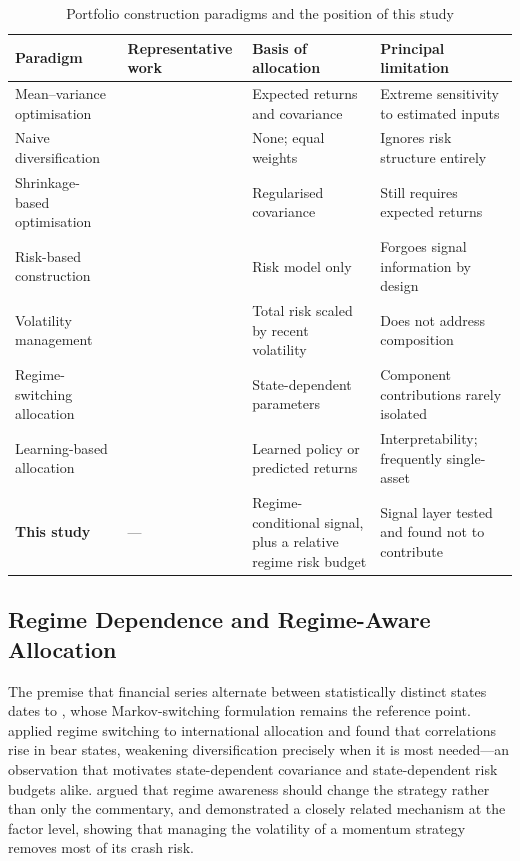 \begin{table}[!ht]
\centering
\caption{Portfolio construction paradigms and the position of this study}
\label{tab:paradigms}
\small
\begin{tabular}{p{2.4cm}p{2.4cm}p{2.6cm}p{2.6cm}}
\hline
\textbf{Paradigm} & \textbf{Representative work} & \textbf{Basis of allocation} & \textbf{Principal limitation} \\
\hline
Mean--variance optimisation & \citet{markowitz52} & Expected returns and covariance & Extreme sensitivity to estimated inputs \\
\hline
Naive diversification & \citet{demiguel09} & None; equal weights & Ignores risk structure entirely \\
\hline
Shrinkage-based optimisation & \citet{ledoit04, lu25} & Regularised covariance & Still requires expected returns \\
\hline
Risk-based construction & \citet{prado16, asimit25} & Risk model only & Forgoes signal information by design \\
\hline
Volatility management & \citet{moreira17, hood25} & Total risk scaled by recent volatility & Does not address composition \\
\hline
Regime-switching allocation & \citet{angbekaert02, kritzman12, luo26} & State-dependent parameters & Component contributions rarely isolated \\
\hline
Learning-based allocation & \citet{jiang25, ashrafzadeh25, agal25} & Learned policy or predicted returns & Interpretability; frequently single-asset \\
\hline
\textbf{This study} & --- & Regime-conditional signal, plus a relative regime risk budget & Signal layer tested and found not to contribute \\
\hline
\end{tabular}
\end{table}

\subsection{Regime Dependence and Regime-Aware Allocation}

The premise that financial series alternate between statistically distinct states dates
to \citet{hamilton89}, whose Markov-switching formulation remains the reference point.
\citet{angbekaert02} applied regime switching to international allocation and found that
correlations rise in bear states, weakening diversification precisely when it is most
needed---an observation that motivates state-dependent covariance and state-dependent
risk budgets alike. \citet{kritzman12} argued that regime awareness should change the
strategy rather than only the commentary, and \citet{barroso15} demonstrated a
closely related mechanism at the factor level, showing that managing the volatility of
a momentum strategy removes most of its crash risk.

